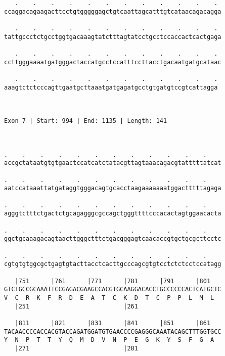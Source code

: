 \documentclass{article}
\begin{document}
\begin{Verbatim}
   .    .    .    .    .    .    .    .    .    .    .    . 
ccaggacagaagacttcctgtgggggagctgtcaattagcatttgtcataacagacagga
                                                            
   .    .    .    .    .    .    .    .    .    .    .    . 
tattgccctctgcctggtgacaaagtatctttagtatcctgcctccaccactcactgaga
                                                            
   .    .    .    .    .    .    .    .    .    .    .    . 
ccttgggaaaatgatgggactaccatgcctccatttccttacctgacaatgatgcataac
                                                            
   .    .    .    .    .    .    .    .    .    .    .    .
aaagtctctcccagttgaatgcttaaatgatgagatgcctgtgatgtccgtcattagga
                                                           
                                                           
 
Exon 7 | Start: 994 | End: 1135 | Length: 141



.    .    .    .    .    .    .    .    .    .    .    .    
accgctataatgtgtgaactccatcatctatacgttagtaaacagacgtatttttatcat
                                                            
.    .    .    .    .    .    .    .    .    .    .    .    
aatccataaattatgataggtgggacagtgcacctaagaaaaaaatggactttttagaga
                                                            
.    .    .    .    .    .    .    .    .    .    .    .    
agggtctttctgactctgcagagggcgccagctgggttttcccacactagtggaacacta
                                                            
.    .    .    .    .    .    .    .    .    .    .    .    
ggctgcaaagacagtaacttgggctttctgacgggagtcaacaccgtgctgcgcttcctc
                                                            
.    .    .    .    .    .    .    .    .    .    .    .    
cgtgtgtggcgctgagtgtacttacctcacttgcccagcgtgtcctctctcctccatagg
                                                            
   |751      |761      |771      |781      |791      |801   
GTCTGCCGCAAATTCCGAGACGAAGCCACGTGCAAGGACACCTGCCCCCCACTCATGCTC
V  C  R  K  F  R  D  E  A  T  C  K  D  T  C  P  P  L  M  L  
   |251                          |261                       
  
   |811      |821      |831      |841      |851      |861   
TACAACCCCACCACGTACCAGATGGATGTGAACCCCGAGGGCAAATACAGCTTTGGTGCC
Y  N  P  T  T  Y  Q  M  D  V  N  P  E  G  K  Y  S  F  G  A  
   |271                          |281                       
  

\end{Verbatim}
\end{document}
